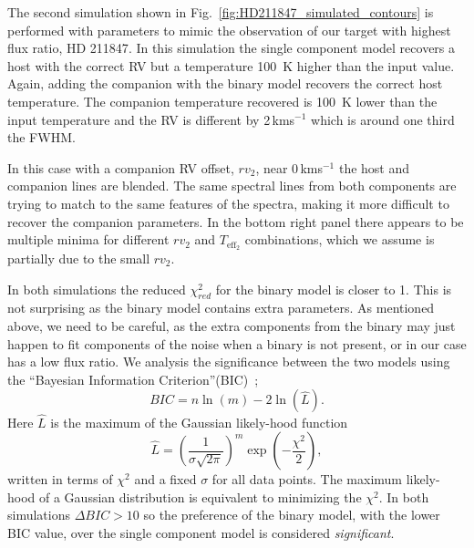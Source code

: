\documentclass[fleqn,usenatbib]{mnras}
\newcommand{\kmps}{\,kms\(^{-1}\)}	%
\newcommand*\rd{\color{red}}
\begin{document}
The second simulation shown in Fig.~\ref{fig:HD211847_simulated_contours} is performed with parameters to mimic the observation of our target with highest flux ratio, {HD 211847}. In this simulation the single component model recovers a host with the correct RV but a temperature 100~K higher than the input value. Again, adding the companion with the binary model recovers the correct host temperature. The companion temperature recovered is 100~K lower than the input temperature and the RV is different by 2\kmps{} which is around one third the FWHM.

In this case with a companion RV offset, \({rv}_2\), near 0\kmps{} the host and companion lines are blended. The same spectral lines from both components are trying to match to the same features of the spectra, making it more difficult to recover the companion parameters. In the bottom right panel there appears to be multiple minima for different \({rv}_2\) and \(T_{\textrm{eff}_2}\) combinations, which we assume is partially due to the small \({rv}_2\).

In both simulations the reduced \(\chi^2_{red}\) for the binary model is closer to 1. This is not surprising as the binary model contains extra parameters. As mentioned above, we need to be careful, as the extra components from the binary may just happen to fit components of the noise when a binary is not present, or in our case has a low flux ratio. 
{\rd We analysis the significance between the two models using the ``Bayesian Information Criterion''(BIC)~\citep{schwarz_estimating_1978}; }
\begin{equation}
BIC = n\ln{(m)} - 2\ln{(\hat{L})}.
\end{equation}
{\rd Here \(\hat{L}\) is the maximum of the Gaussian likely-hood function }
 \begin{equation}
 \hat{L} = \left(\frac{1}{\sigma \sqrt{2\pi}}\right)^m \exp{\left(-\frac{\chi^2}{2}\right)},
 \end{equation}
 {\rd written in terms of \(\chi^2\) and a fixed $\sigma$ for all data points. The maximum likely-hood of a Gaussian distribution is equivalent  to minimizing the \(\chi^2\). In both simulations \(\Delta BIC >10\) so the preference of the binary model, with the lower BIC value, over the single component model is considered \emph{significant}.}


\end{document}
